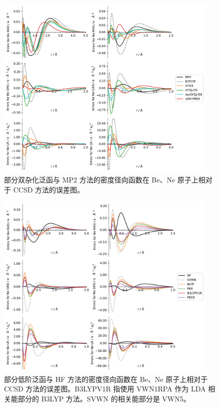\begin{figure}[hp]
    \centering
    \includegraphics[width=0.95\textwidth]{assets/supp-fig-s1.pdf}
    \caption[部分双杂化泛函与 MP2 方法密度径向函数在 Be、Ne 原子的误差]{部分双杂化泛函与 MP2 方法的密度径向函数在 Be、Ne 原子上相对于 CCSD 方法的误差图。}
    \label{fig.4.supp-fig-s1}
\end{figure}

\begin{figure}[hp]
    \centering
    \includegraphics[width=0.95\textwidth]{assets/supp-fig-s2.pdf}
    \caption[部分低阶泛函密度径向函数在 Be、Ne 原子的误差]{部分低阶泛函与 HF 方法的密度径向函数在 Be、Ne 原子上相对于 CCSD 方法的误差图。B3LYPV1R 指使用 VWN1RPA 作为 LDA 相关能部分的 B3LYP 方法。SVWN 的相关能部分是 VWN5。}
    \label{fig.4.supp-fig-s2}
\end{figure}


